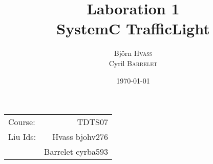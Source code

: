 \documentclass{article}
\title{Laboration 1 \\ SystemC TrafficLight} %
\author{
  Björn \textsc{Hvass}\\
  Cyril \textsc{Barrelet}
} %
\date{\today} %
\begin{document}
\maketitle %

\begin{center}
\begin{tabular}{l r}
Course: & TDTS07\\ %
Liu Ids: & Hvass bjohv276\\ %
& Barrelet cyrba593 \\
\end{tabular}
\end{center}


\newpage
\newpage
\newpage
\newpage
\newpage


\end{document}
